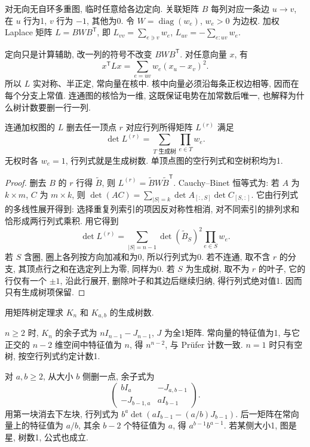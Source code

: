 \label{ch:matrixtree}
\begin{definition}
对无向无自环多重图, 临时任意给各边定向. 关联矩阵 $B$ 每列对应一条边 $u\to v$, 在 $u$ 行为1, $v$ 行为 $-1$, 其他为0. 令 $W=\operatorname{diag}(w_e)$, $w_e>0$ 为边权. 加权 Laplace 矩阵 $L=BWB^{\mathsf T}$, 即 $L_{vv}=\sum_{e\ni v}w_e$, $L_{uv}=-\sum_{e:uv}w_e$.
\end{definition}
定向只是计算辅助, 改一列的符号不改变 $BWB^{\mathsf T}$. 对任意向量 $x$, 有
\begin{equation}\label{eq:lapenergy}
x^{\mathsf T}Lx=\sum_{e=uv}w_e(x_u-x_v)^2.
\end{equation}
所以 $L$ 实对称、半正定, 常向量在核中. 核中向量必须沿每条正权边相等, 因而在每个分支上常值. 连通图的核恰为一维, 这既保证电势在加常数后唯一, 也解释为什么树计数要删一行一列.
\begin{theorem}[加权矩阵树]\label{thm:matrix-tree}
连通加权图的 $L$ 删去任一顶点 $r$ 对应行列所得矩阵 $L^{(r)}$ 满足
\[
\det L^{(r)}=\sum_{T\text{ 生成树}}\prod_{e\in T}w_e.
\]
无权时各 $w_e=1$, 行列式就是生成树数. 单顶点图的空行列式和空树积均为1.
\end{theorem}
\begin{proof}
删去 $B$ 的 $r$ 行得 $\widetilde B$, 则 $L^{(r)}=\widetilde B W\widetilde B^{\mathsf T}$. Cauchy--Binet 恒等式为: 若 $A$ 为 $k\times m$, $C$ 为 $m\times k$, 则 $\det(AC)=\sum_{|S|=k}\det A_{[:,S]}\det C_{[S,:]}$. 它由行列式的多线性展开得到: 选择重复列索引的项因反对称性相消, 对不同索引的排列求和恰形成两行列式乘积. 用它得到
\[
\det L^{(r)}=\sum_{|S|=n-1}\det(\widetilde B_S)^2\prod_{e\in S}w_e.
\]
若 $S$ 含圈, 圈上各列按方向加减和为0, 所以行列式为0. 若不连通, 取不含 $r$ 的分支, 其顶点行之和在选定列上为零, 同样为0. 若 $S$ 为生成树, 取不为 $r$ 的叶子, 它的行仅有一个 $\pm1$, 沿此行展开, 删除叶子和其边后继续归纳, 得行列式绝对值1. 因而只有生成树项保留.
\end{proof}
\begin{example}
用矩阵树定理求 $K_n$ 和 $K_{a,b}$ 的生成树数.
\end{example}
\begin{solution}
$n\ge2$ 时, $K_n$ 的余子式为 $nI_{n-1}-J_{n-1}$, $J$ 为全1矩阵. 常向量的特征值为1, 与它正交的 $n-2$ 维空间中特征值为 $n$, 得 $n^{n-2}$, 与 Prüfer 计数一致. $n=1$ 时只有空树, 按空行列式约定计数1.

对 $a,b\ge2$, 从大小 $b$ 侧删一点, 余子式为
\[
\begin{pmatrix}bI_a&-J_{a,b-1}\\-J_{b-1,a}&aI_{b-1}\end{pmatrix}.
\]
用第一块消去下左块, 行列式为 $b^a\det(aI_{b-1}-(a/b)J_{b-1})$. 后一矩阵在常向量上的特征值为 $a/b$, 其余 $b-2$ 个特征值为 $a$, 得 $a^{b-1}b^{a-1}$. 若某侧大小1, 图是星, 树数1, 公式也成立.
\end{solution}

